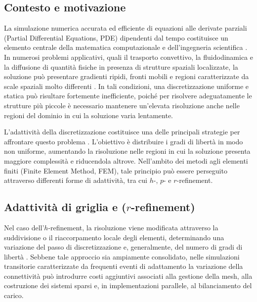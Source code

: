 \subsection{Contesto e motivazione}

La simulazione numerica accurata ed efficiente di equazioni alle derivate parziali (Partial Differential Equations, PDE) dipendenti dal tempo costituisce un elemento centrale della matematica computazionale e dell'ingegneria scientifica \citep{quarteroni2009the}. In numerosi problemi applicativi, quali il trasporto convettivo, la fluidodinamica e la diffusione di quantità fisiche in presenza di strutture spaziali localizzate, la soluzione può presentare gradienti ripidi, fronti mobili e regioni caratterizzate da scale spaziali molto differenti \citep{donea2003finite}. In tali condizioni, una discretizzazione uniforme e statica può risultare fortemente inefficiente, poiché per risolvere adeguatamente le strutture più piccole è necessario mantenere un'elevata risoluzione anche nelle regioni del dominio in cui la soluzione varia lentamente.

L'adattività della discretizzazione costituisce una delle principali strategie per affrontare questo problema \citep{bangerth2003adaptive}. L'obiettivo è distribuire i gradi di libertà in modo non uniforme, aumentando la risoluzione nelle regioni in cui la soluzione presenta maggiore complessità e riducendola altrove. Nell'ambito dei metodi agli elementi finiti (Finite Element Method, FEM), tale principio può essere perseguito attraverso differenti forme di adattività, tra cui $h$-, $p$- e $r$-refinement.

\subsection{\texorpdfstring{Adattività di griglia e ($r$-refinement)}{Adattività di griglia e(r-refinement)}}

Nel caso dell'$h$-refinement, la risoluzione viene modificata attraverso la suddivisione o il riaccorpamento locale degli elementi, determinando una variazione del passo di discretizzazione e, generalmente, del numero di gradi di libertà \citep{berger1984adaptive}. Sebbene tale approccio sia ampiamente consolidato, nelle simulazioni transitorie caratterizzate da frequenti eventi di adattamento la variazione della connettività può introdurre costi aggiuntivi associati alla gestione della mesh, alla costruzione dei sistemi sparsi e, in implementazioni parallele, al bilanciamento del carico.


